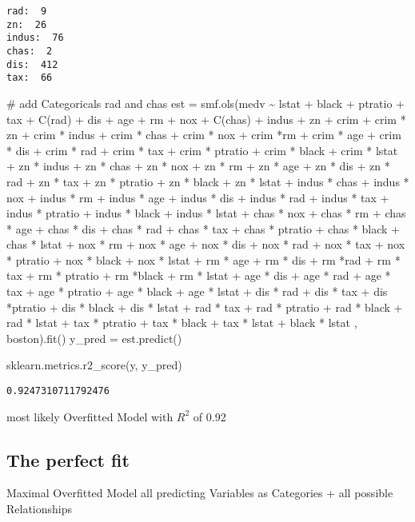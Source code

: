\documentclass[
  letterpaper,
  DIV=11,
  numbers=noendperiod]{scrreprt}
\newenvironment{Shaded}{\begin{snugshade}}{\end{snugshade}}
\newcommand{\CommentTok}[1]{\textcolor[rgb]{0.37,0.37,0.37}{#1}}
\newcommand{\NormalTok}[1]{\textcolor[rgb]{0.00,0.23,0.31}{#1}}
\newcommand{\OperatorTok}[1]{\textcolor[rgb]{0.37,0.37,0.37}{#1}}
\newcommand{\StringTok}[1]{\textcolor[rgb]{0.13,0.47,0.30}{#1}}
\begin{document}
\begin{verbatim}
rad:  9
zn:  26
indus:  76
chas:  2
dis:  412
tax:  66
\end{verbatim}

\begin{Shaded}
\begin{Highlighting}[]
\CommentTok{\# add Categoricals rad and chas}
\NormalTok{est }\OperatorTok{=}\NormalTok{ smf.ols(}\StringTok{\textquotesingle{}medv \textasciitilde{} lstat + black + ptratio + tax + C(rad) + dis + age + rm + nox + C(chas) + indus + zn + crim + crim * zn + crim * indus + crim * chas + crim * nox + crim *rm + crim * age + crim * dis + crim * rad + crim * tax + crim * ptratio + crim * black + crim * lstat + zn * indus + zn * chas + zn * nox + zn * rm + zn * age + zn * dis + zn * rad + zn * tax + zn * ptratio + zn * black + zn * lstat + indus * chas + indus * nox + indus * rm + indus * age + indus * dis + indus * rad + indus * tax + indus * ptratio + indus * black + indus * lstat + chas * nox + chas * rm + chas * age + chas * dis + chas * rad + chas * tax + chas * ptratio + chas * black + chas * lstat + nox * rm + nox * age + nox * dis + nox * rad + nox * tax + nox * ptratio + nox * black + nox * lstat + rm * age + rm * dis + rm *rad + rm * tax + rm * ptratio + rm *black + rm * lstat + age * dis + age * rad + age * tax + age * ptratio + age * black + age * lstat + dis * rad + dis * tax + dis *ptratio + dis * black + dis * lstat + rad * tax + rad * ptratio + rad * black + rad * lstat + tax * ptratio + tax * black + tax * lstat + black * lstat \textquotesingle{}}\NormalTok{, boston).fit()}
\NormalTok{y\_pred }\OperatorTok{=}\NormalTok{ est.predict()}

\NormalTok{sklearn.metrics.r2\_score(y, y\_pred)}
\end{Highlighting}
\end{Shaded}

\begin{verbatim}
0.9247310711792476
\end{verbatim}

most likely Overfitted Model with \(R^2\) of 0.92

\hypertarget{the-perfect-fit}{%
\subsection{The perfect fit}\label{the-perfect-fit}}

Maximal Overfitted Model all predicting Variables as Categories + all
possible Relationships
\end{document}

